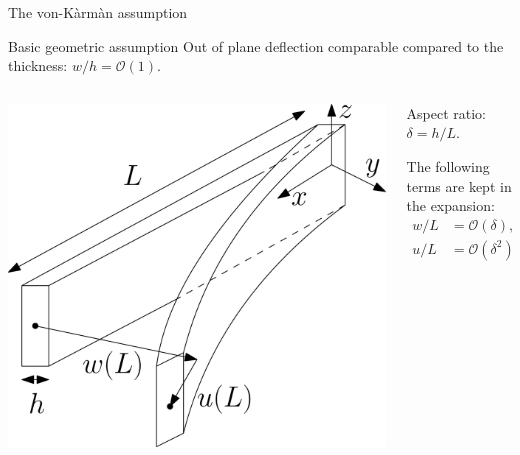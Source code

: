 \documentclass{beamer}
\begin{document}
\begin{frame}{The von-K\`arm\`an assumption}
		
\begin{block}{Basic geometric assumption}
	Out of plane deflection comparable compared to the thickness: $w/h = \mathcal{O}(1)$. \\
\end{block}

\begin{columns}
	\begin{column}{.55\textwidth}
		\includegraphics[width=1\columnwidth]{beam_deflected.eps}
	\end{column}
	\begin{column}{.45\textwidth}
		Aspect ratio: $\delta= h/L$.
		
		The following terms are kept in the expansion:
		\begin{equation*}
		\begin{aligned}
			w/L &= \mathcal{O}(\delta), \\
			u/L &= \mathcal{O}(\delta^2), \\
		\end{aligned}
		\end{equation*}
	\end{column}
\end{columns}

\end{frame}
\end{document}
